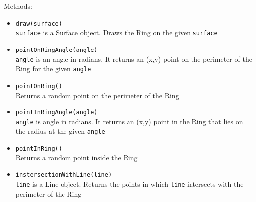 \documentclass[12pt,letterpaper]{article}
\newcommand{\tableheader}{\rowfont\bf\rowcolor{thcolor!30}}
\begin{document}
        \noindent Methods:
        \begin{itemize}
            \item \texttt{draw(surface)} \\
                \texttt{surface} is a Surface object. Draws the Ring on the given \texttt{surface}
            \item \texttt{pointOnRingAngle(angle)} \\
                \texttt{angle} is an angle in radians. It returns an (x,y) point on the perimeter of the Ring for the given \texttt{angle}
            \item \texttt{pointOnRing()} \\
                Returns a random point on the perimeter of the Ring
            \item \texttt{pointInRingAngle(angle)} \\
                \texttt{angle} is angle in radians. It returns an (x,y) point in the Ring that lies on the radius at the given \texttt{angle}
            \item \texttt{pointInRing()} \\
                Returns a random point inside the Ring
            \item \texttt{instersectionWithLine(line)} \\
                \texttt{line} is a Line object. Returns the points in which \texttt{line} intersects with the perimeter of the Ring
        \end{itemize}

    
\end{document}
